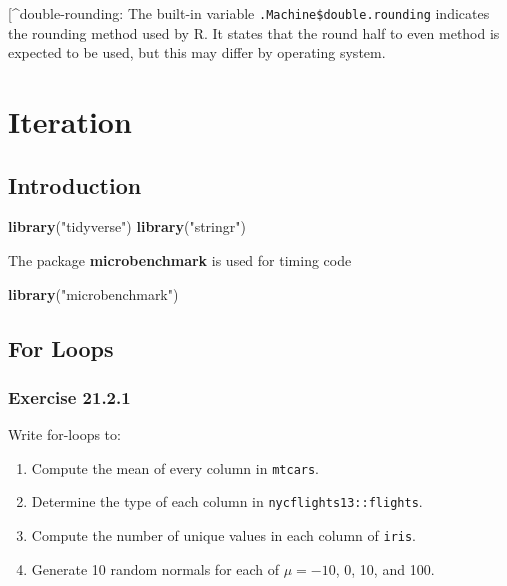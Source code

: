 \documentclass[]{book}
\newenvironment{Shaded}{\begin{snugshade}}{\end{snugshade}}
\newcommand{\KeywordTok}[1]{\textcolor[rgb]{0.13,0.29,0.53}{\textbf{#1}}}
\newcommand{\NormalTok}[1]{#1}
\newcommand{\StringTok}[1]{\textcolor[rgb]{0.31,0.60,0.02}{#1}}
\providecommand{\tightlist}{%
  \setlength{\itemsep}{0pt}\setlength{\parskip}{0pt}}
\theoremstyle{plain}
\theoremstyle{remark}
\theoremstyle{definition}
\theoremstyle{definition}
\theoremstyle{definition}
\theoremstyle{remark}
\begin{document}
{[}\^{}double-rounding: The built-in variable
\texttt{.Machine\$double.rounding} indicates the rounding method used by
R. It states that the round half to even method is expected to be used,
but this may differ by operating system.

\hypertarget{iteration}{%
\chapter{Iteration}\label{iteration}}

\hypertarget{introduction-14}{%
\section{Introduction}\label{introduction-14}}

\begin{Shaded}
\begin{Highlighting}[]
\KeywordTok{library}\NormalTok{(}\StringTok{"tidyverse"}\NormalTok{)}
\KeywordTok{library}\NormalTok{(}\StringTok{"stringr"}\NormalTok{)}
\end{Highlighting}
\end{Shaded}

The package \textbf{microbenchmark} is used for timing code

\begin{Shaded}
\begin{Highlighting}[]
\KeywordTok{library}\NormalTok{(}\StringTok{"microbenchmark"}\NormalTok{)}
\end{Highlighting}
\end{Shaded}

\hypertarget{for-loops}{%
\section{For Loops}\label{for-loops}}

\hypertarget{exercise-21.2.1}{%
\subsection*{\texorpdfstring{Exercise
{21.2.1}}{Exercise 21.2.1}}\label{exercise-21.2.1}}

Write for-loops to:

\begin{enumerate}
\def\labelenumi{\arabic{enumi}.}
\tightlist
\item
  Compute the mean of every column in \texttt{mtcars}.
\item
  Determine the type of each column in \texttt{nycflights13::flights}.
\item
  Compute the number of unique values in each column of \texttt{iris}.
\item
  Generate 10 random normals for each of \(\mu = -10\), 0, 10, and 100.
\end{enumerate}
\end{document}
